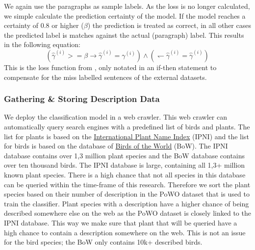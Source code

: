 \documentclass[a4paper, 12pt, oneside]{book} %
\begin{document}
We again use the paragraphs as sample labels.
As the loss is no longer calculated, we simple calculate the prediction certainty of the model.
If the model reaches a certainty of 0.8 or higher (\(\beta\)) the prediction is treated as correct, in all other cases the predicted label is matches against the actual (paragraph) label.
This results in the following equation:
\begin{equation} \label{eq:softloss_ifthen}
(\hat{\gamma}^{(i)} >= \beta \rightarrow \hat{\gamma}^{(i)} = \gamma^{(i)}) \wedge ( \leftharpoondown \hat{\gamma}^{(i)} = \hat{\gamma}^{(i)})
\end{equation}
This is the loss function from \textcite{reed_training_2015}, only notated in an if-then statement to compensate for the miss labelled sentences of the external datasets.


\subsubsection{Gathering \& Storing Description Data}
We deploy the classification model in a web crawler.
This web crawler can automatically query search engines with a predefined list of birds and plants.
The list for plants is based on the \href{https://www.ipni.org/}{International Plant Name Index} (IPNI) and the list for birds is based on the database of \href{https://birdsoftheworld.org/bow/home}{Birds of the World} (BoW).
The IPNI database contains over 1,3 million plant species and the BoW database contains over ten thousand birds.
The IPNI database is large, containing all 1,3+ million known plant species.
There is a high chance that not all species in this database can be queried within the time-frame of this research.
Therefore we sort the plant species based on their number of description in the PoWO dataset that is used to train the classifier.
Plant species with a description have a higher chance of being described somewhere else on the web as the PoWO dataset is closely linked to the IPNI database.
This way we make sure that plant that will be queried have a high chance to contain a description somewhere on the web.
This is not an issue for the bird species; the BoW only contains 10k+ described birds.
\end{document}
